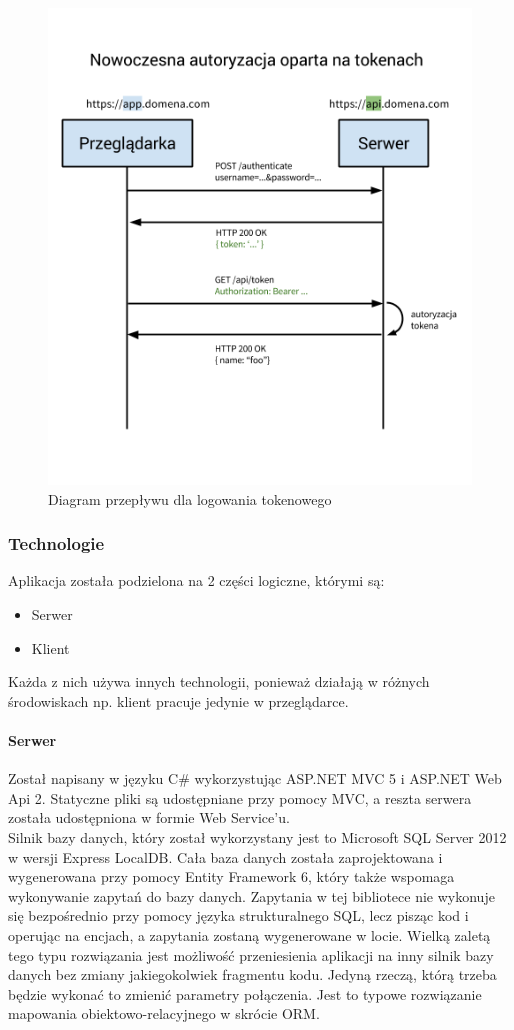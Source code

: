 \documentclass[10pt,titlepage]{article}
\begin{document}
\begin{figure}[H]
  \centering
  \includegraphics[scale=0.355]{images/tokenAuth2.png}
  \caption{Diagram przepływu dla logowania tokenowego}
\end{figure}
\subsubsection{Technologie}
Aplikacja została podzielona na 2 części logiczne, którymi są:
\begin{itemize}
  \item Serwer
  \item Klient
\end{itemize}
Każda z nich używa innych technologii, ponieważ działają w różnych środowiskach np. klient pracuje jedynie w przeglądarce.
\paragraph{Serwer}
Został napisany w języku C\# wykorzystując ASP.NET MVC 5 i ASP.NET Web Api 2. Statyczne pliki są udostępniane przy pomocy MVC, a reszta serwera została udostępniona w formie Web Service'u.\\ Silnik bazy danych, który został wykorzystany jest to Microsoft SQL Server 2012 w wersji Express LocalDB. Cała baza danych została zaprojektowana i wygenerowana przy pomocy Entity Framework 6, który także wspomaga wykonywanie zapytań do bazy danych. Zapytania w tej bibliotece nie wykonuje się bezpośrednio przy pomocy języka strukturalnego SQL, lecz pisząc kod i operując na encjach, a zapytania zostaną wygenerowane w locie. Wielką zaletą tego typu rozwiązania jest możliwość przeniesienia aplikacji na inny silnik bazy danych bez zmiany jakiegokolwiek fragmentu kodu. Jedyną rzeczą, którą trzeba będzie wykonać to zmienić parametry połączenia. Jest to typowe rozwiązanie mapowania obiektowo-relacyjnego w skrócie ORM.
\end{document}
